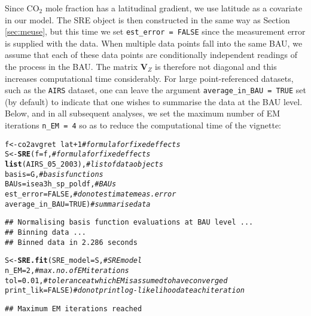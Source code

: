 \documentclass{article}\usepackage[]{graphicx}\usepackage[]{color}
\makeatletter
\newcommand{\hlnum}[1]{\textcolor[rgb]{0.686,0.059,0.569}{#1}}%
\newcommand{\hlcom}[1]{\textcolor[rgb]{0.678,0.584,0.686}{\textit{#1}}}%
\newcommand{\hlopt}[1]{\textcolor[rgb]{0,0,0}{#1}}%
\newcommand{\hlstd}[1]{\textcolor[rgb]{0.345,0.345,0.345}{#1}}%
\newcommand{\hlkwb}[1]{\textcolor[rgb]{0.69,0.353,0.396}{#1}}%
\newcommand{\hlkwc}[1]{\textcolor[rgb]{0.333,0.667,0.333}{#1}}%
\newcommand{\hlkwd}[1]{\textcolor[rgb]{0.737,0.353,0.396}{\textbf{#1}}}%
\newenvironment{kframe}{%
 \def\at@end@of@kframe{}%
 \ifinner\ifhmode%
  \def\at@end@of@kframe{\end{minipage}}%
  \begin{minipage}{\columnwidth}%
 \fi\fi%
 \def\FrameCommand##1{\hskip\@totalleftmargin \hskip-\fboxsep
 \colorbox{shadecolor}{##1}\hskip-\fboxsep
     \hskip-\linewidth \hskip-\@totalleftmargin \hskip\columnwidth}%
 \MakeFramed {\advance\hsize-\width
   \@totalleftmargin\z@ \linewidth\hsize
   \@setminipage}}%
 {\par\unskip\endMakeFramed%
 \at@end@of@kframe}
\newenvironment{knitrout}{}{} %
\renewcommand{\tt} {\texttt}
\newcommand{\Vmat} {\textbf{V}}
\makeatother
\begin{document}
\vspace{0.1in}

 Since CO$_2$ mole fraction has a latitudinal gradient, we use latitude as a covariate in our model. The SRE object is then constructed in the same way as Section \ref{sec:meuse}, but this time we set \tt{est\_error = FALSE} since the measurement error is supplied with the data. When multiple data points fall into the same BAU, we assume that each of these data points are conditionally independent readings of the process in the BAU. The matrix $\Vmat_Z$ is therefore not diagonal and this increases computational time considerably. For large point-referenced datasets, such as the \tt{AIRS} dataset, one can leave the argument \tt{average\_in\_BAU = TRUE} set (by default) to indicate that one wishes to summarise the data at the BAU level. Below, and in all subsequent analyses, we set the maximum number of EM iterations \tt{n\_EM = 4} so as to reduce the computational time of the vignette:

\begin{knitrout}
\color{fgcolor}\begin{kframe}
\begin{alltt}
\hlstd{f} \hlkwb{<-} \hlstd{co2avgret} \hlopt{~} \hlstd{lat} \hlopt{+} \hlnum{1}         \hlcom{# formula for fixed effects}
\hlstd{S} \hlkwb{<-} \hlkwd{SRE}\hlstd{(}\hlkwc{f} \hlstd{= f,}                  \hlcom{# formula for fixed effects}
         \hlkwd{list}\hlstd{(AIRS_05_2003),}     \hlcom{# list of data objects}
         \hlkwc{basis} \hlstd{= G,}              \hlcom{# basis functions}
         \hlkwc{BAUs} \hlstd{= isea3h_sp_poldf,} \hlcom{# BAUs}
         \hlkwc{est_error} \hlstd{=} \hlnum{FALSE}\hlstd{,}      \hlcom{# do not estimate meas. error}
         \hlkwc{average_in_BAU} \hlstd{=} \hlnum{TRUE}\hlstd{)}  \hlcom{# summarise data}
\end{alltt}
\begin{verbatim}
## Normalising basis function evaluations at BAU level ...
## Binning data ...
## Binned data in 2.286 seconds
\end{verbatim}
\begin{alltt}
\hlstd{S} \hlkwb{<-} \hlkwd{SRE.fit}\hlstd{(}\hlkwc{SRE_model} \hlstd{= S,}    \hlcom{# SRE model}
             \hlkwc{n_EM} \hlstd{=} \hlnum{2}\hlstd{,}         \hlcom{# max. no. of EM iterations}
             \hlkwc{tol} \hlstd{=} \hlnum{0.01}\hlstd{,}       \hlcom{# tolerance at which EM is assumed to have converged}
             \hlkwc{print_lik}\hlstd{=}\hlnum{FALSE}\hlstd{)}  \hlcom{# do not print log-likelihood at each iteration}
\end{alltt}
\begin{verbatim}
## Maximum EM iterations reached
\end{verbatim}
\end{kframe}
\end{knitrout}
\end{document}

